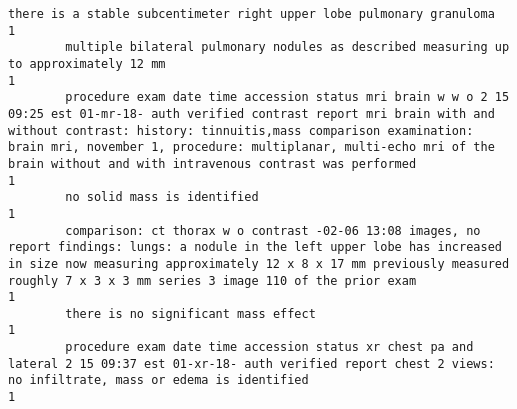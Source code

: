 \documentclass[11pt]{article}
\begin{document}
\begin{Verbatim}[commandchars=\\\{\}]
        there is a stable subcentimeter right upper lobe pulmonary granuloma                                                                                                                                                                                                                                                                                                                                                            1
        multiple bilateral pulmonary nodules as described measuring up to approximately 12 mm                                                                                                                                                                                                                                                                                                                                           1
        procedure exam date time accession status mri brain w w o 2 15 09:25 est 01-mr-18- auth verified contrast report mri brain with and without contrast: history: tinnuitis,mass comparison examination: brain mri, november 1, procedure: multiplanar, multi-echo mri of the brain without and with intravenous contrast was performed                                                                                            1
        no solid mass is identified                                                                                                                                                                                                                                                                                                                                                                                                     1
        comparison: ct thorax w o contrast -02-06 13:08 images, no report findings: lungs: a nodule in the left upper lobe has increased in size now measuring approximately 12 x 8 x 17 mm previously measured roughly 7 x 3 x 3 mm series 3 image 110 of the prior exam                                                                                                                                                               1
        there is no significant mass effect                                                                                                                                                                                                                                                                                                                                                                                             1
        procedure exam date time accession status xr chest pa and lateral 2 15 09:37 est 01-xr-18- auth verified report chest 2 views: no infiltrate, mass or edema is identified                                                                                                                                                                                                                                                       1

\end{Verbatim}
\end{document}
